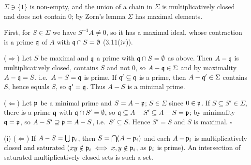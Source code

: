 \documentclass[11pt]{article}
\begin{document}
\pf
$\Sigma\ni\{1\}$ is non-empty, and the union of a chain in $\Sigma$ is multiplicatively closed and does not contain $0$; by Zorn's lemma $\Sigma$ has maximal elements.

First, for $S\in\Sigma$ we have $S^{-1}A\ne0$, so it has a maximal ideal, whose contraction is a prime $\mathfrak q$ of $A$ with $\mathfrak q\cap S=\emptyset$ (3.11(iv)).

($\Rightarrow$) Let $S$ be maximal and $\mathfrak q$ a prime with $\mathfrak q\cap S=\emptyset$ as above. Then $A-\mathfrak q$ is multiplicatively closed, contains $S$ and not $0$, so $A-\mathfrak q\in\Sigma$ and by maximality $A-\mathfrak q=S$, i.e.\ $A-S=\mathfrak q$ is prime. If $\mathfrak q'\subseteq\mathfrak q$ is a prime, then $A-\mathfrak q'\in\Sigma$ contains $S$, hence equals $S$, so $\mathfrak q'=\mathfrak q$. Thus $A-S$ is a minimal prime.

($\Leftarrow$) Let $\mathfrak p$ be a minimal prime and $S=A-\mathfrak p$; $S\in\Sigma$ since $0\in\mathfrak p$. If $S\subseteq S'\in\Sigma$, there is a prime $\mathfrak q$ with $\mathfrak q\cap S'=\emptyset$, so $\mathfrak q\subseteq A-S'\subseteq A-S=\mathfrak p$; by minimality $\mathfrak q=\mathfrak p$, so $A-S'\supseteq\mathfrak p=A-S$, i.e.\ $S'\subseteq S$. Hence $S'=S$ and $S$ is maximal. \hfill$\square$

\pf
(i) ($\Leftarrow$) If $A-S=\bigcup\mathfrak p_i$, then $S=\bigcap(A-\mathfrak p_i)$ and each $A-\mathfrak p_i$ is multiplicatively closed and saturated ($xy\notin\mathfrak p_i\iff x,y\notin\mathfrak p_i$, as $\mathfrak p_i$ is prime). An intersection of saturated multiplicatively closed sets is such a set.
\end{document}
